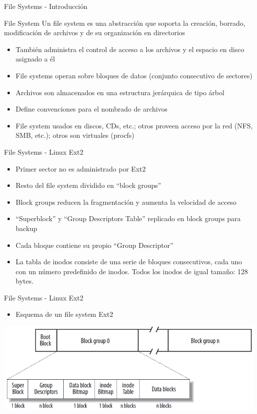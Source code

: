 \begin{frame}{File Systems - Introducción}
 \begin{block}{File System}
   Un file system es una abstracción que soporta la creación, borrado, modificación de archivos y de su
   organización en directorios
 \end{block}
 \begin{itemize}
  \item También administra el control de acceso a los archivos y el espacio en disco asignado a él
  \item File systems operan sobre bloques de datos (conjunto consecutivo de sectores)
  \item Archivos son almacenados en una estructura jerárquica de tipo árbol
  \item Define convenciones para el nombrado de archivos
  \item File system usados en discos, CDs, etc.; otros proveen acceso por la red (NFS, SMB, etc.); otros
    son virtuales (procfs)
 \end{itemize}
\end{frame}

\begin{frame}{File Systems - Linux Ext2}
 \begin{itemize}
  \item Primer sector no es administrado por Ext2
  \item Resto del file system dividido en ``block groups''
  \item Block groups reducen la fragmentación y aumenta la velocidad de acceso
  \item ``Superblock'' y ``Group Descriptors Table'' replicado en block groups para backup
  \item Cada bloque contiene su propio ``Group Descriptor''
  \item La tabla de inodos consiste de una serie de bloques consecutivos, cada uno con un 
    número predefinido de inodos. Todos los inodos de igual tamaño: 128 bytes.
 \end{itemize}
\end{frame}

\begin{frame}{File Systems - Linux Ext2}
 \begin{itemize}
  \item Esquema de un file system Ext2
 \end{itemize} 
 \begin{center}
  \includegraphics[width=1.0\textwidth]{images/ext2.png}
 \end{center}
\end{frame}

